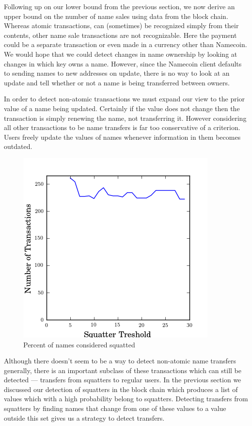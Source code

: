 Following up on our lower bound from the previous section, we now derive an upper bound on the number of name sales using data from the block chain. Whereas atomic transactions, can (sometimes) be recognized simply from their contents, other name sale transactions are not recognizable. Here the payment could be a separate transaction or even made in a currency other than Namecoin. We would hope that we could detect changes in name ownership by looking at changes in which key owns a name. However, since the Namecoin client defaults to sending names to new addresses on update, there is no way to look at an update and tell whether or not a name is being transferred between owners.

In order to detect non-atomic transactions we must expand our view to the prior value of a name being updated. Certainly if the value does not change then the transaction is simply renewing the name, not transferring it. However considering all other transactions to be name transfers is far too conservative of a criterion. Users freely update the values of names whenever information in them becomes outdated.

\begin{figure}
  \centering
  \includegraphics[width=0.9\columnwidth]{figures/transfers}
  \caption{Percent of names considered squatted}
  \label{fig:percentSquatter}
\end{figure}

Although there doesn't seem to be a way to detect non-atomic name transfers generally, there is an important subclass of these transactions which can still be detected --- transfers from squatters to regular users. In the previous section we discussed our detection of squatters in the block chain which produces a list of values which with a high probability belong to squatters. Detecting transfers from squatters by finding names that change from one of these values to a value outside this set gives us a strategy to detect transfers.

